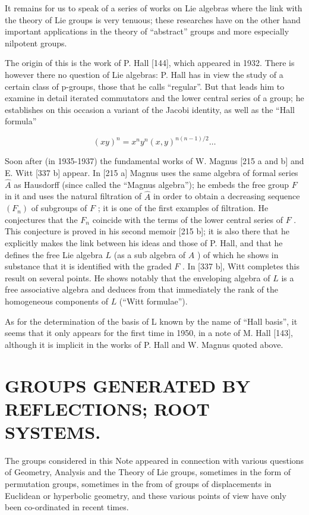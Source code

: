 It remains for us to speak of a series of works on Lie algebras where the link with the theory of Lie groups is very tenuous; these researches have on the other hand important applications in the theory of ``abstract'' groups and more especially nilpotent groups.

The origin of this is the work of P. Hall {[}144{]}, which appeared in 1932. There is however there no question of Lie algebras: P. Hall has in view the study of a certain class of p-groups, those that he calls ``regular''. But that leads him to examine in detail iterated commutators and the lower central series of a group; he establishes on this occasion a variant of the Jacobi identity, as well as the ``Hall formula''

\[
(x y) ^ {n} = x ^ {n} y ^ {n} (x, y) ^ {n (n - 1) / 2} \dots
\]

Soon after (in 1935-1937) the fundamental works of W. Magnus {[}215 a and b{]} and E. Witt {[}337 b{]} appear. In {[}215 a{]} Magnus uses the same algebra of formal series \(\hat{A}\) as Hausdorff (since called the ``Magnus algebra''); he embeds the free group \(F\) in it and uses the natural filtration of \(\hat{A}\) in order to obtain a decreasing sequence \((F_n)\) of subgroups of \(F\) ; it is one of the first examples of filtration. He conjectures that the \(F_n\) coincide with the terms of the lower central series of \(F\) . This conjecture is proved in his second memoir {[}215 b{]}; it is also there that he explicitly makes the link between his ideas and those of P. Hall, and that he defines the free Lie algebra \(L\) (as a sub algebra of \(A\) ) of which he shows in substance that it is identified with the graded \(F\) . In {[}337 b{]}, Witt completes this result on several points. He shows notably that the enveloping algebra of \(L\) is a free associative algebra and deduces from that immediately the rank of the homogeneous components of \(L\) (``Witt formulae'').

As for the determination of the basis of L known by the name of ``Hall basis'', it seems that it only appears for the first time in 1950, in a note of M. Hall {[}143{]}, although it is implicit in the works of P. Hall and W. Magnus quoted above.

\chapter{GROUPS GENERATED BY REFLECTIONS; ROOT SYSTEMS.}

The groups considered in this Note appeared in connection with various questions of Geometry, Analysis and the Theory of Lie groups, sometimes in the form of permutation groups, sometimes in the from of groups of displacements in Euclidean or hyperbolic geometry, and these various points of view have only been co-ordinated in recent times.

